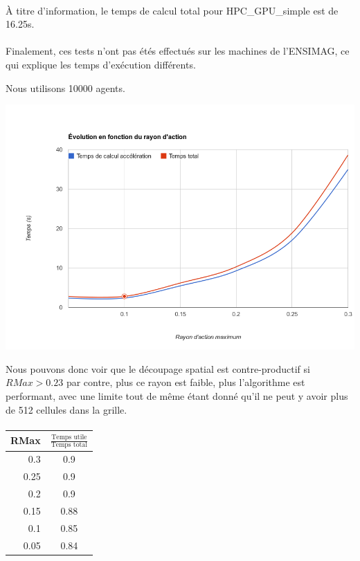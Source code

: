 \documentclass[liens,entete-ensimag,margeCorrection]{ensirapport}
\begin{document}
\paragraph{}
À titre d'information, le temps de calcul total pour HPC\_GPU\_simple est de 16.25s.
\paragraph{}
Finalement, ces tests n'ont pas étés effectués sur les machines de l'ENSIMAG, ce qui explique les temps d'exécution différents.

Nous utilisons 10000 agents.

\includegraphics[width=\linewidth]{RadiusPerf}

Nous pouvons donc voir que le découpage spatial est contre-productif si $RMax > 0.23$ par contre, plus ce rayon est faible, plus l'algorithme est performant, avec une limite tout de même étant donné qu'il ne peut y avoir plus de 512 cellules dans la grille.
\paragraph{}
\begin{tabular}{|r|c|}
	\hline
	RMax & $\frac{\text{Temps utile}}{\text{Temps total}}$ \\
	\hline
	0.3 & 0.9 \\
	\hline
	0.25 & 0.9 \\
	\hline
	0.2 & 0.9 \\
	\hline
	0.15 & 0.88 \\
	\hline
	0.1 & 0.85 \\
	\hline
	0.05 & 0.84 \\
	\hline
\end{tabular}
\end{document}
